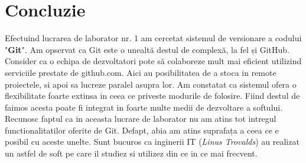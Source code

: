 \section*{Concluzie}
Efectuind lucrarea de laborator nr. 1 am cercetat sistemul de versionare a codului "\textbf{Git}". Am opservat ca Git este o unealtă destul de complexă, la fel și GitHub. Consider ca o echipa de dezvoltatori pote să colaboreze mult mai eficient utilizind serviciile prestate de github.com. Aici au posibilitatea de a stoca in remote proiectele, si apoi sa lucreze paralel asupra lor. Am constatat ca sistemul ofera o flexibilitate foarte extinsa in ceea ce priveste modurile de folosire. Fiind destul de faimos acesta poate fi integrat in foarte multe medii de dezvoltare a softului.\\
Recunosc faptul ca in aceasta lucrare de laborator nu am atins tot intregul functionalitatilor oferite de Git. Defapt, abia am atins suprafața a ceea ce e posibil cu aceste unelte. Sunt bucuros ca inginerii IT (\emph{Linus Trovalds}) au realizat un astfel de soft pe care il studiez si utilizez din ce in ce mai frecvent.
\clearpage